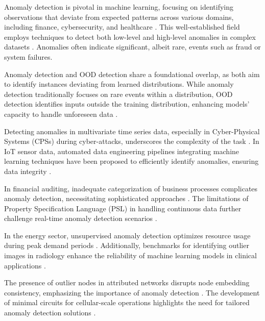 Anomaly detection is pivotal in machine learning, focusing on identifying observations that deviate from expected patterns across various domains, including finance, cybersecurity, and healthcare \cite{frank2024circuitdesignbiologymachine}. This well-established field employs techniques to detect both low-level and high-level anomalies in complex datasets \cite{boersma2024flexiblecategorizationusingformal}. Anomalies often indicate significant, albeit rare, events such as fraud or system failures.

Anomaly detection and OOD detection share a foundational overlap, as both aim to identify instances deviating from learned distributions. While anomaly detection traditionally focuses on rare events within a distribution, OOD detection identifies inputs outside the training distribution, enhancing models' capacity to handle unforeseen data \cite{li2019anomalydetectiongenerativeadversarial}.

Detecting anomalies in multivariate time series data, especially in Cyber-Physical Systems (CPSs) during cyber-attacks, underscores the complexity of the task \cite{li2019anomalydetectiongenerativeadversarial}. In IoT sensor data, automated data engineering pipelines integrating machine learning techniques have been proposed to efficiently identify anomalies, ensuring data integrity \cite{li2021automateddataengineeringpipeline}.

In financial auditing, inadequate categorization of business processes complicates anomaly detection, necessitating sophisticated approaches \cite{boersma2024flexiblecategorizationusingformal}. The limitations of Property Specification Language (PSL) in handling continuous data further challenge real-time anomaly detection scenarios \cite{smith2022psldeadlonglive}.

In the energy sector, unsupervised anomaly detection optimizes resource usage during peak demand periods \cite{pallage2024slicedwassersteinbasedanomalydetectionopen}. Additionally, benchmarks for identifying outlier images in radiology enhance the reliability of machine learning models in clinical applications \cite{islam2024outlierdetectionlargeradiological}.

The presence of outlier nodes in attributed networks disrupts node embedding consistency, emphasizing the importance of anomaly detection \cite{bandyopadhyay2018outlierawarenetworkembedding}. The development of minimal circuits for cellular-scale operations highlights the need for tailored anomaly detection solutions \cite{frank2024circuitdesignbiologymachine}.


